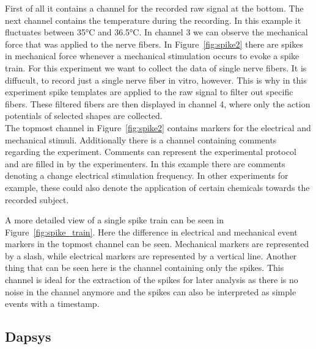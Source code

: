 First of all it contains a channel for the recorded raw signal at the bottom. The next channel contains the temperature during the recording. In this example it fluctuates between 35°C and 36.5°C. In channel 3 we can observe the mechanical force that was applied to the nerve fibers. In Figure~\ref{fig:spike2} there are spikes in mechanical force whenever a mechanical stimulation occurs to evoke a spike train. For this experiment we want to collect the data of single nerve fibers. It is diffucult, to record just a single nerve fiber in vitro, however. This is why in this experiment spike templates are applied to the raw signal to filter out specific fibers. These filtered fibers are then displayed in channel 4, where only the action potentials of selected shapes are collected.\\
The topmost channel in Figure~\ref{fig:spike2} contains markers for the electrical and mechanical stimuli. Additionally there is a channel containing comments regarding the experiment. Comments can represent the experimental protocol and are filled in by the experimenters. In this example there are comments denoting a change electrical stimulation frequency. In other experiments for example, these could also denote the application of certain chemicals towards the recorded subject.

A more detailed view of a single spike train can be seen in Figure~\ref{fig:spike_train}. Here the difference in electrical and mechanical event markers in the topmost channel can be seen. Mechanical markers are represented by a slash, while electrical markers are represented by a vertical line. Another thing that can be seen here is the channel containing only the spikes. This channel is ideal for the extraction of the spikes for later analysis as there is no noise in the channel anymore and the spikes can also be interpreted as simple events with a timestamp.

\subsection{Dapsys}

